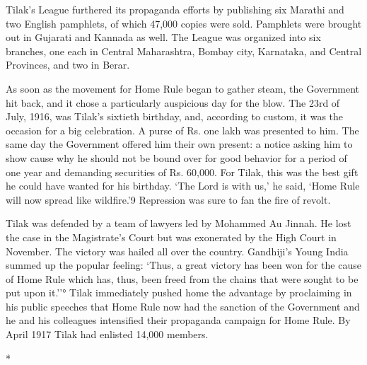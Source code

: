 Tilak's League furthered its propaganda efforts by publishing six Marathi and two English pamphlets, of which 47,000 copies were sold. Pamphlets were brought out in Gujarati and Kannada as well. The League was organized into six branches, one each in Central Maharashtra, Bombay city, Karnataka, and Central Provinces, and two in Berar.

As soon as the movement for Home Rule began to gather steam, the Government hit back, and it chose a particularly auspicious day for the blow. The 23rd of July, 1916, was Tilak's sixtieth birthday, and, according to custom, it was the occasion for a big celebration. A purse of Rs. one lakh was presented to him. The same day the Government offered him their own present: a notice asking him to show cause why he should not be bound over for good behavior for a period of one year and demanding securities of Rs. 60,000. For Tilak, this was the best gift he could have wanted for his birthday. `The Lord is with us,' he said, `Home Rule will now spread like wildfire.'9 Repression was sure to fan the fire of revolt.

Tilak was defended by a team of lawyers led by Mohammed Au Jinnah. He lost the case in the Magistrate's Court but was exonerated by the High Court in November. The victory was hailed all over the country. Gandhiji's Young India summed up the popular feeling: `Thus, a great victory has been won for the cause of Home Rule which has, thus, been freed from the chains that were sought to be put upon it.''° Tilak immediately pushed home the advantage by proclaiming in his public speeches that Home Rule now had the sanction of the Government and he and his colleagues intensified their propaganda campaign for Home Rule. By April 1917 Tilak had enlisted 14,000 members.

\begin{center}*\end{center}

\paragraph*{}


